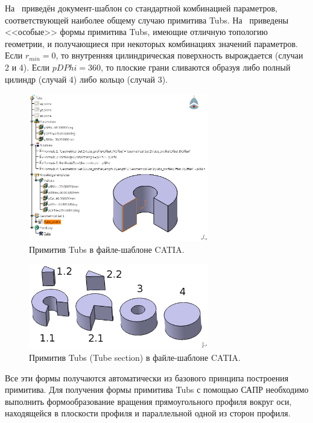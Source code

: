 
На~ приведён документ-шаблон со стандартной комбинацией параметров, соответствующей наиболее общему случаю примитива Tubs. На~ приведены <<особые>> формы примитива Tubs, имеющие отличную топологию геометрии, и получающиеся при некоторых комбинациях значений параметров.
Если $r_{min}=0$, то внутренняя цилиндрическая поверхность вырождается (случаи 2 и 4).
Если $pDPhi = 360$, то плоские грани сливаются образуя либо полный цилиндр (случай 4) либо кольцо (случай 3).

\begin{figure}[H]
\centering
\includegraphics[width=0.7\textwidth]{pictures/Tubs_UDF_file.png}
\caption{Примитив Tubs в файле-шаблоне CATIA.}
\label{fig:TubsUDF}
\end{figure}

\begin{figure}[H]
\centering
\includegraphics[width=0.7\textwidth]{pictures/Tubs_cases_2.png}
\caption{Примитив Tubs (Tube section) в файле-шаблоне CATIA.}
\label{fig:TubsCases}
\end{figure}

Все эти формы получаются автоматически из базового принципа построения примитива.
Для получения формы примитива Tubs с помощью САПР необходимо выполнить формообразование вращения прямоугольного профиля вокруг оси, находящейся в плоскости профиля и параллельной одной из сторон профиля.

